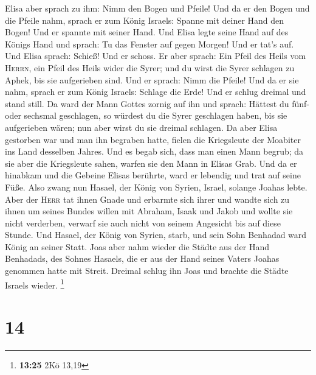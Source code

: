  Elisa aber sprach zu ihm: Nimm den Bogen und Pfeile! Und
da er den Bogen und die Pfeile nahm,  sprach er zum König
Israels: Spanne mit deiner Hand den Bogen! Und er spannte mit seiner
Hand. Und Elisa legte seine Hand auf des Königs Hand  und
sprach: Tu das Fenster auf gegen Morgen! Und er tat's auf. Und Elisa
sprach: Schieß! Und er schoss. Er aber sprach: Ein Pfeil des Heils vom
\textsc{Herrn}, ein Pfeil des Heils wider die Syrer; und du wirst die
Syrer schlagen zu Aphek, bis sie aufgerieben sind.  Und
er sprach: Nimm die Pfeile! Und da er sie nahm, sprach er zum König
Israels: Schlage die Erde! Und er schlug dreimal und stand still.
 Da ward der Mann Gottes zornig auf ihn und sprach:
Hättest du fünf- oder sechsmal geschlagen, so würdest du die Syrer
geschlagen haben, bis sie aufgerieben wären; nun aber wirst du sie
dreimal schlagen.  Da aber Elisa gestorben war und man
ihn begraben hatte, fielen die Kriegsleute der Moabiter ins Land
desselben Jahres.  Und es begab sich, dass man einen Mann
begrub; da sie aber die Kriegsleute sahen, warfen sie den Mann in Elisas
Grab. Und da er hinabkam und die Gebeine Elisas berührte, ward er
lebendig und trat auf seine Füße.  Also zwang nun Hasael,
der König von Syrien, Israel, solange Joahas lebte.  Aber
der \textsc{Herr} tat ihnen Gnade und erbarmte sich ihrer und wandte
sich zu ihnen um seines Bundes willen mit Abraham, Isaak und Jakob und
wollte sie nicht verderben, verwarf sie auch nicht von seinem Angesicht
bis auf diese Stunde.  Und Hasael, der König von Syrien,
starb, und sein Sohn Benhadad ward König an seiner Statt.
 Joas aber nahm wieder die Städte aus der Hand Benhadads,
des Sohnes Hasaels, die er aus der Hand seines Vaters Joahas genommen
hatte mit Streit. Dreimal schlug ihn Joas und brachte die Städte Israels
wieder. \footnote{\textbf{13:25} 2Kö 13,19}

\hypertarget{section-4}{%
\section{14}\label{section-4}}

